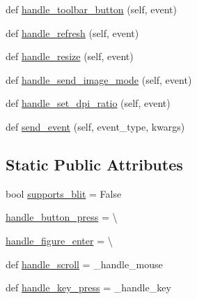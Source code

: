 \begin{DoxyCompactItemize}
\item 
def \hyperlink{classmatplotlib_1_1backends_1_1backend__webagg__core_1_1FigureCanvasWebAggCore_a754a4346f5ff6629a0e4e3d2e00f4e50}{handle\+\_\+toolbar\+\_\+button} (self, event)
\item 
def \hyperlink{classmatplotlib_1_1backends_1_1backend__webagg__core_1_1FigureCanvasWebAggCore_aa5549248eed0522f7b122d518c42d85a}{handle\+\_\+refresh} (self, event)
\item 
def \hyperlink{classmatplotlib_1_1backends_1_1backend__webagg__core_1_1FigureCanvasWebAggCore_af5a972d12d5569b7098f32aa2607d35b}{handle\+\_\+resize} (self, event)
\item 
def \hyperlink{classmatplotlib_1_1backends_1_1backend__webagg__core_1_1FigureCanvasWebAggCore_a779f55cb77c0cdd60ba1c9274a83c697}{handle\+\_\+send\+\_\+image\+\_\+mode} (self, event)
\item 
def \hyperlink{classmatplotlib_1_1backends_1_1backend__webagg__core_1_1FigureCanvasWebAggCore_aca0c504960d2e8a9b406bc771529499e}{handle\+\_\+set\+\_\+dpi\+\_\+ratio} (self, event)
\item 
def \hyperlink{classmatplotlib_1_1backends_1_1backend__webagg__core_1_1FigureCanvasWebAggCore_a6a36a06a7baac3bac9b3d8edd4f6446c}{send\+\_\+event} (self, event\+\_\+type, kwargs)
\end{DoxyCompactItemize}
\subsection*{Static Public Attributes}
\begin{DoxyCompactItemize}
\item 
bool \hyperlink{classmatplotlib_1_1backends_1_1backend__webagg__core_1_1FigureCanvasWebAggCore_ad99141c740e1b9c5c89d4ac92a412d81}{supports\+\_\+blit} = False
\item 
\hyperlink{classmatplotlib_1_1backends_1_1backend__webagg__core_1_1FigureCanvasWebAggCore_a14c8739a8dd3fed37022363793e38847}{handle\+\_\+button\+\_\+press} = \textbackslash{}
\item 
\hyperlink{classmatplotlib_1_1backends_1_1backend__webagg__core_1_1FigureCanvasWebAggCore_aa85293e55ad0979ef1f3b59d5968e6bf}{handle\+\_\+figure\+\_\+enter} = \textbackslash{}
\item 
def \hyperlink{classmatplotlib_1_1backends_1_1backend__webagg__core_1_1FigureCanvasWebAggCore_ab06a1ce0129fccb77b0de31a8772488f}{handle\+\_\+scroll} = \+\_\+handle\+\_\+mouse
\item 
def \hyperlink{classmatplotlib_1_1backends_1_1backend__webagg__core_1_1FigureCanvasWebAggCore_a923a6e2ad11fb056bd0ee5e4e7c6692e}{handle\+\_\+key\+\_\+press} = \+\_\+handle\+\_\+key
\end{DoxyCompactItemize}
